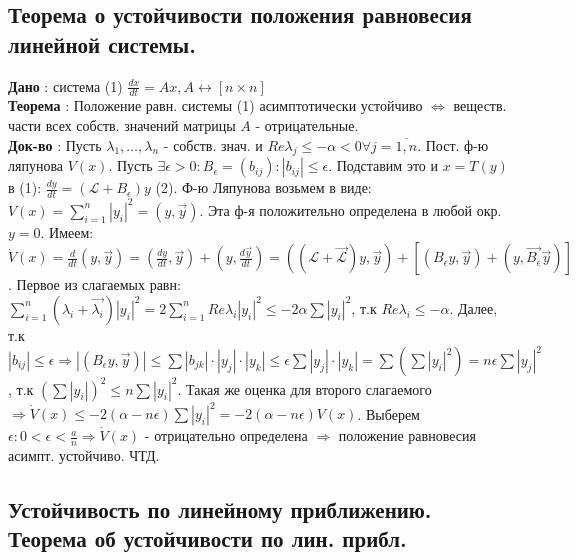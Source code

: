 \documentclass[unicode, 8pt, a4paper,oneside, landscape]{article}
\begin{document}
\begin{multicols}{4}

\subsection{Теорема о устойчивости положения равновесия линейной системы.}
{\bf Дано} : система (1) $\frac{dx}{dt} = Ax, A \leftrightarrow [n \times n]$\\
{\bf Теорема} : Положение равн. системы (1) асимптотически устойчиво $\Leftrightarrow$ веществ. части всех собств. значений матрицы $A$ - отрицательные.\\
{\bf Док-во} : Пусть $\lambda_1, \ldots, \lambda_n$ - собств. знач. и $Re \lambda_j \leq -\alpha < 0 \forall j = \overline{1, n}$. Пост. ф-ю ляпунова $V(x)$.  Пусть $\exists \epsilon > 0 : B_\epsilon = (b_{ij}) : |b_{ij}| \leq \epsilon$. Подставим это и $x = T(y)$ в (1): $\frac{dy}{dt} = (\mathcal{L} + B_\epsilon)y$ (2). Ф-ю Ляпунова возьмем в виде: $V(x) = \sum_{i=1}^n |y_i|^2 = (y, \vec{y})$. Эта ф-я положительно определена в любой окр. $y=0$. Имеем: $\dot{V}(x) = \frac{d}{dt}(y, \vec{y}) = (\frac{dy}{dt}, \vec{y}) + (y, \frac{d\vec{y}}{dt}) = ((\mathcal{L} + \vec{\mathcal{L}})y, \vec{y}) + [(B_\epsilon y, \vec{y}) + (y, \vec{B_\epsilon}\vec{y})]$. Первое из слагаемых равн: $\sum_{i=1}^n(\lambda_i + \vec{\lambda_i})|y_i|^2 = 2\sum_{i=1}^nRe\lambda_i|y_i|^2 \leq -2\alpha\sum|y_i|^2$, т.к $Re\lambda_i \leq -\alpha$. Далее, т.к $|b_{ij}| \leq \epsilon \Rightarrow |(B_\epsilon y, \vec{y})| \leq \sum|b_{jk}| \cdot |y_j|\cdot |y_k| \leq \epsilon\sum|y_j|\cdot|y_k| = \sum(\sum|y_i|^2) = n\epsilon\sum|y_j|^2$, т.к $(\sum |y_i|)^2 \leq n\sum|y_i|^2$. Такая же оценка для второго слагаемого $\Rightarrow \dot{V}(x) \leq -2(\alpha - n\epsilon)\sum|y_i|^2 = -2(\alpha - n\epsilon)V(x)$. Выберем $\epsilon : 0 < \epsilon < \frac{a}{n} \Rightarrow \dot{V}(x)$  - отрицательно определена $\Rightarrow$ положение равновесия асимпт. устойчиво. ЧТД.


\subsection{Устойчивость по линейному приближению. Теорема об устойчивости по лин. прибл.}


\end{multicols}
\end{document}
